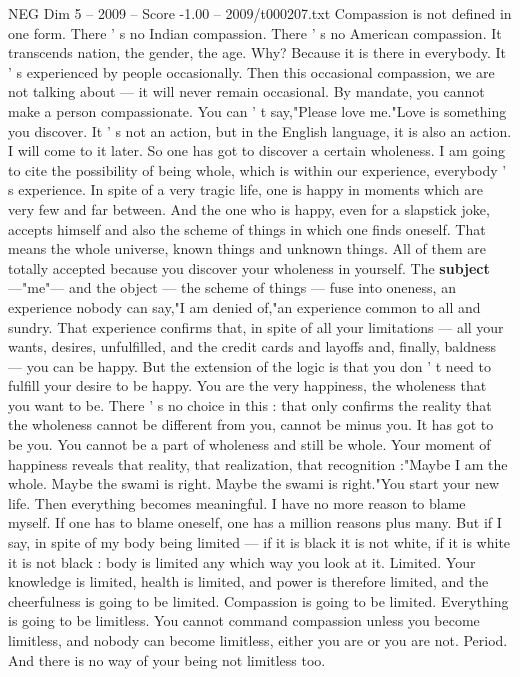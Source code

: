 \begin{textsample}{NEG Dim 5 – 2009 – Score -1.00 – 2009/t000207.txt}
Compassion is not defined in one form.
There ' s no Indian compassion.
There ' s no American compassion.
It transcends nation, the gender, the age.
Why?
Because it is there in everybody.
It ' s experienced by people occasionally.
Then this occasional compassion, we are not talking about — it will never remain occasional.
By mandate, you cannot make a person compassionate.
You can ' t say,"Please love me."Love is something you discover.
It ' s not an action, but in the English language, it is also an action.
I will come to it later.
So one has got to discover a certain wholeness.
I am going to cite the possibility of being whole, which is within our experience, everybody ' s experience.
In spite of a very tragic life, one is happy in moments which are very few and far between.
And the one who is happy, even for a slapstick joke, accepts himself and also the scheme of things in which one finds oneself.
That means the whole universe, known things and unknown things.
All of them are totally accepted because you discover your wholeness in yourself.
The \textbf{subject} —"me"— and the object — the scheme of things — fuse into oneness, an experience nobody can say,"I am denied of,"an experience common to all and sundry.
That experience confirms that, in spite of all your limitations — all your wants, desires, unfulfilled, and the credit cards and layoffs and, finally, baldness — you can be happy.
But the extension of the logic is that you don ' t need to fulfill your desire to be happy.
You are the very happiness, the wholeness that you want to be.
There ' s no choice in this : that only confirms the reality that the wholeness cannot be different from you, cannot be minus you.
It has got to be you.
You cannot be a part of wholeness and still be whole.
Your moment of happiness reveals that reality, that realization, that recognition :"Maybe I am the whole.
Maybe the swami is right.
Maybe the swami is right."You start your new life.
Then everything becomes meaningful.
I have no more reason to blame myself.
If one has to blame oneself, one has a million reasons plus many.
But if I say, in spite of my body being limited — if it is black it is not white, if it is white it is not black : body is limited any which way you look at it.
Limited.
Your knowledge is limited, health is limited, and power is therefore limited, and the cheerfulness is going to be limited.
Compassion is going to be limited.
Everything is going to be limitless.
You cannot command compassion unless you become limitless, and nobody can become limitless, either you are or you are not.
Period.
And there is no way of your being not limitless too.

\end{textsample}

